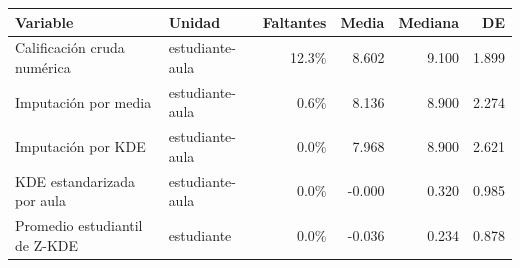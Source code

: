 \begin{tabularx}{\textwidth}{@{}>{\raggedright\arraybackslash}X l r r r r@{}}
\toprule
Variable & Unidad & Faltantes & Media & Mediana & DE \\
\midrule
Calificación cruda numérica & estudiante-aula & 12.3\% & 8.602 & 9.100 & 1.899 \\
Imputación por media & estudiante-aula & 0.6\% & 8.136 & 8.900 & 2.274 \\
Imputación por KDE & estudiante-aula & 0.0\% & 7.968 & 8.900 & 2.621 \\
KDE estandarizada por aula & estudiante-aula & 0.0\% & -0.000 & 0.320 & 0.985 \\
Promedio estudiantil de Z-KDE & estudiante & 0.0\% & -0.036 & 0.234 & 0.878 \\
\bottomrule
\end{tabularx}
